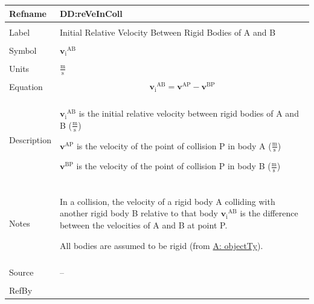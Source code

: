 \documentclass[12pt]{article}
\begin{document}
\vspace{\baselineskip}
\noindent
\begin{minipage}{\textwidth}
\begin{tabular}{>{\raggedright}p{}>{\raggedright\arraybackslash}p{}}
\toprule \textbf{Refname} & \textbf{DD:reVeInColl}
\label{DD:reVeInColl}
\\ \midrule \\
Label & Initial Relative Velocity Between Rigid Bodies of A and B
        
\\ \midrule \\
Symbol & ${{\mathbf{v}_{\text{i}}}^{\text{A}\text{B}}}$
         
\\ \midrule \\
Units & $\frac{\text{m}}{\text{s}}$
        
\\ \midrule \\
Equation & \begin{displaymath}
           {{\mathbf{v}_{\text{i}}}^{\text{A}\text{B}}}={\mathbf{v}^{\text{A}\text{P}}}-{\mathbf{v}^{\text{B}\text{P}}}
           \end{displaymath}
\\ \midrule \\
Description & \begin{symbDescription}
              \item{${{\mathbf{v}_{\text{i}}}^{\text{A}\text{B}}}$ is the initial relative velocity between rigid bodies of A and B ($\frac{\text{m}}{\text{s}}$)}
              \item{${\mathbf{v}^{\text{A}\text{P}}}$ is the velocity of the point of collision P in body A ($\frac{\text{m}}{\text{s}}$)}
              \item{${\mathbf{v}^{\text{B}\text{P}}}$ is the velocity of the point of collision P in body B ($\frac{\text{m}}{\text{s}}$)}
              \end{symbDescription}
\\ \midrule \\
Notes & In a collision, the velocity of a rigid body A colliding with another rigid body B relative to that body ${{\mathbf{v}_{\text{i}}}^{\text{A}\text{B}}}$ is the difference between the velocities of A and B at point P.
        
        All bodies are assumed to be rigid (from \hyperref[assumpOT]{A: objectTy}).
        
\\ \midrule \\
Source & --
         
\\ \midrule \\
RefBy & 
\\ \bottomrule
\end{tabular}
\end{minipage}
\end{document}
